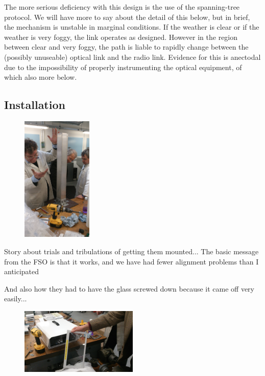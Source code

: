 The more serious deficiency with this design is the use of the
spanning-tree protocol. We will have more to say about the detail of
this below, but in brief, the mechanism is unstable in marginal
conditions. If the weather is clear or if the weather is very foggy,
the link operates as designed. However in the region between clear and
very foggy, the path is liable to rapidly change between the (possibly
unuseable) optical link and the radio link. Evidence for this is
anectodal due to the impossibility of properly instrumenting the
optical equipment, of which also more below.
\clearpage

\subsection{Installation}
\label{sec:fittings}

\begin{figure}
  \includegraphics[angle=-90,width=0.3\textwidth]{tada}
\end{figure}
Story about trials and tribulations of getting them mounted...
The basic message from the FSO is that it works, and we have
had fewer alignment problems than I anticipated

And also how they had to have the glass screwed down because it came
off very easily...

\begin{figure}[h]
  \begin{center}
    \includegraphics[width=0.5\textwidth]{faulty}
  \end{center}
\end{figure}

